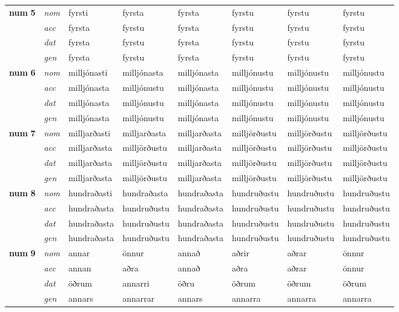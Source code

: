 \begin{longtable}[l]{l>{\footnotesize\itshape}lXXXXXX}
\multirow{3}{*}{{{\textbf{num} \Large{\textbf{5}}}}}  &  nom & fyrsti & fyrsta    & fyrsta & fyrstu & fyrstu & fyrstu \\*
  & acc &  fyrsta  & fyrstu   & fyrsta & fyrstu & fyrstu & fyrstu \\*
&  dat & fyrsta & fyrstu   & fyrsta & fyrstu & fyrstu & fyrstu \\*
  & gen & fyrsta  & fyrstu  & fyrsta & fyrstu & fyrstu & fyrstu\\
\cmidrule{1-8}

\multirow{3}{*}{{{\textbf{num} \Large{\textbf{6}}}}}  &  nom & milljónasti & milljónasta    & milljónasta & milljónustu & milljónustu & milljónustu \\*
  & acc &  milljónasta  & milljónustu   & milljónasta & milljónustu & milljónustu & milljónustu \\*
&  dat & milljónasta & milljónustu   & milljónasta & milljónustu & milljónustu & milljónustu \\*
  & gen & milljónasta  & milljónustu  & milljónasta & milljónustu & milljónustu & milljónustu\\
\cmidrule{1-8}

\multirow{3}{*}{{{\textbf{num} \Large{\textbf{7}}}}}  &  nom & milljarðasti & milljarðasta    & milljarðasta & milljörðustu & milljörðustu & milljörðustu \\*
  & acc &  milljarðasta  & milljörðustu   & milljarðasta & milljörðustu & milljörðustu & milljörðustu \\*
&  dat & milljarðasta & milljörðustu   & milljarðasta & milljörðustu & milljörðustu & milljörðustu \\*
  & gen & milljarðasta  & milljörðustu  & milljarðasta & milljörðustu & milljörðustu & milljörðustu\\
\cmidrule{1-8}

\multirow{3}{*}{{{\textbf{num} \Large{\textbf{8}}}}}  &  nom & hundraðasti & hundraðasta    & hundraðasta & hundruðustu & hundruðustu & hundruðustu \\*
  & acc &  hundraðasta  & hundruðustu   & hundraðasta & hundruðustu & hundruðustu & hundruðustu \\*
&  dat & hundraðasta & hundruðustu   & hundraðasta & hundruðustu & hundruðustu & hundruðustu \\*
  & gen & hundraðasta  & hundruðustu  & hundraðasta & hundruðustu & hundruðustu & hundruðustu\\
\cmidrule{1-8}

\multirow{3}{*}{{{\textbf{num} \Large{\textbf{9}}}}}  &  nom & annar & önnur    & annað & aðrir & aðrar & önnur \\*
  & acc &  annan  & aðra   & annað & aðra & aðrar & önnur \\*
&  dat & öðrum & annarri   & öðru & öðrum & öðrum & öðrum \\*
  & gen & annars  & annarrar  & annars & annarra & annarra & annarra\\

\bottomrule
\end{longtable}
